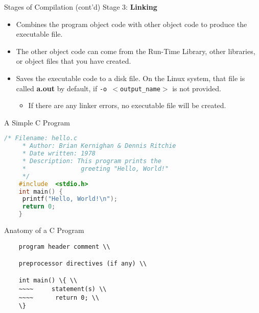 \documentclass[graphics]{beamer}
\begin{document}
\begin{frame}{Stages of Compilation (cont'd)}
    Stage 3: \textbf{Linking}
    \begin{itemize}
        \item Combines the program object code with other object code to produce the executable file.
        \item The other object code can come from the Run-Time Library, other libraries, or object files that you have created.
        \item Saves the executable code to a disk file.  On the Linux system, that file is called \textbf{a.out} by default, if \texttt{-o $<$output\_name$>$} is not provided.
        \begin{itemize}
            \item If there are any linker errors, no executable file will be created.
        \end{itemize}
    \end{itemize}
\end{frame}

\begin{frame}[fragile]{A Simple C Program}
    \begin{lstlisting}[language=c,showspaces=false,keywordstyle=\color{magenta},stringstyle=\color{purple},basicstyle=\ttfamily\footnotesize,numberstyle=\tiny\color{codegray},commentstyle=\color{green},]
    /* Filename: hello.c
     * Author: Brian Kernighan & Dennis Ritchie
     * Date written: 1978
     * Description: This program prints the
     *               greeting "Hello, World!"
     */
    #include  <stdio.h>
    int main() {
     printf("Hello, World!\n");
     return 0;
    }
    \end{lstlisting}
\end{frame}

\begin{frame}[fragile]{Anatomy of a C Program}
    \begin{verbatim}
    program header comment \\

    preprocessor directives (if any) \\
    
    int main() \{ \\
    ~~~~     statement(s) \\
    ~~~~      return 0; \\
    \}
    \end{verbatim}
\end{frame}
\end{document}
